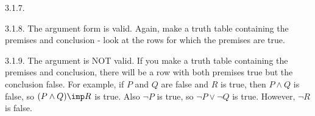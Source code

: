 \begin {itemize}
\begin{ans}{3.1.7.}
\end{ans}
\begin{ans}{3.1.8.}
    The argument form is valid.  Again, make a truth table containing the premises and conclusion - look at the rows for which the premises are true.
  
\end{ans}
\begin{ans}{3.1.9.}
    The argument is NOT valid.  If you make a truth table containing the premises and conclusion, there will be a row with both premises true but the conclusion false.  For example, if $P$ and $Q$ are false and $R$ is true, then $P \wedge Q$ is false, so $(P \wedge Q) \imp R$ is true.  Also $\neg P$ is true, so $\neg P \vee \neg Q$ is true.  However, $\neg R$ is false.
  
\end{ans}
\protect \end {itemize}
